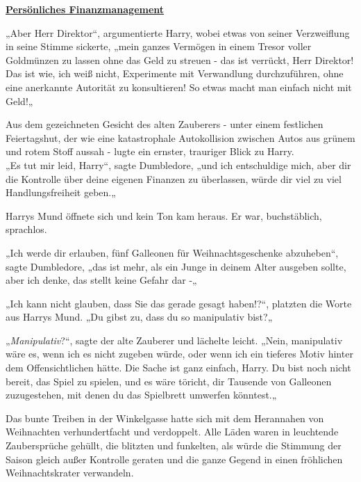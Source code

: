 

\hypertarget{persuxf6nliches-finanzmanagement}{%

\textbf{\uline{Persönliches Finanzmanagement}}

\hfill\break „Aber Herr Direktor“, argumentierte Harry, wobei etwas von seiner Verzweiflung in seine Stimme sickerte, „mein ganzes Vermögen in einem Tresor voller Goldmünzen zu lassen ohne das Geld zu streuen - das ist verrückt, Herr Direktor!\\ Das ist wie, ich weiß nicht, Experimente mit Verwandlung durchzuführen, ohne eine anerkannte Autorität zu konsultieren! So etwas macht man einfach nicht mit Geld!„

Aus dem gezeichneten Gesicht des alten Zauberers - unter einem festlichen Feiertagshut, der wie eine katastrophale Autokollision zwischen Autos aus grünem und rotem Stoff aussah - lugte ein ernster, trauriger Blick zu Harry.\\ „Es tut mir leid, Harry“, sagte Dumbledore, „und ich entschuldige mich, aber dir die Kontrolle über deine eigenen Finanzen zu überlassen, würde dir viel zu viel Handlungsfreiheit geben.„

Harrys Mund öffnete sich und kein Ton kam heraus. Er war, buchstäblich, sprachlos.

„Ich werde dir erlauben, fünf Galleonen für Weihnachtsgeschenke abzuheben“, sagte Dumbledore, „das ist mehr, als ein Junge in deinem Alter ausgeben sollte, aber ich denke, das stellt keine Gefahr dar -„

„Ich kann nicht glauben, dass Sie das gerade gesagt haben!?“, platzten die Worte aus Harrys Mund. „Du gibst zu, dass du so manipulativ bist?„

„\emph{Manipulativ}?“, sagte der alte Zauberer und lächelte leicht. „Nein, manipulativ wäre es, wenn ich es nicht zugeben würde, oder wenn ich ein tieferes Motiv hinter dem Offensichtlichen hätte. Die Sache ist ganz einfach, Harry. Du bist noch nicht bereit, das Spiel zu spielen, und es wäre töricht, dir Tausende von Galleonen zuzugestehen, mit denen du das Spielbrett umwerfen könntest.„

Das bunte Treiben in der Winkelgasse hatte sich mit dem Herannahen von Weihnachten verhundertfacht und verdoppelt. Alle Läden waren in leuchtende Zaubersprüche gehüllt, die blitzten und funkelten, als würde die Stimmung der Saison gleich außer Kontrolle geraten und die ganze Gegend in einen fröhlichen Weihnachtskrater verwandeln.

}
